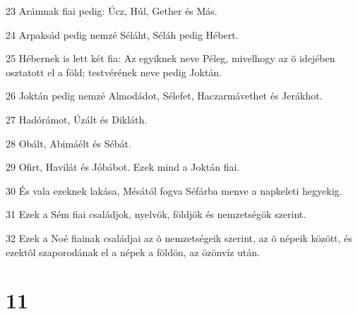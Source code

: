 \par 23 Arámnak fiai pedig: Úcz, Húl, Gether és Más.
\par 24 Arpaksád pedig nemzé Séláht, Séláh pedig Hébert.
\par 25 Hébernek is lett két fia: Az egyiknek neve Péleg, mivelhogy az õ idejében osztatott el a föld; testvérének neve pedig Joktán.
\par 26 Joktán pedig nemzé Almodádot, Sélefet, Haczarmávethet és Jerákhot.
\par 27 Hadórámot, Úzált és Dikláth.
\par 28 Obált, Abimáélt és Sébát.
\par 29 Ofirt, Havilát és Jóbábot. Ezek mind a Joktán fiai.
\par 30 És vala ezeknek lakása, Mésától fogva Séfárba menve a napkeleti hegyekig.
\par 31 Ezek a Sém fiai családjok, nyelvök, földjök és nemzetségök szerint.
\par 32 Ezek a Noé fiainak családjai az õ nemzetségeik szerint, az õ népeik között, és ezektõl szaporodának el a népek a földön, az özönvíz után.

\chapter{11}


